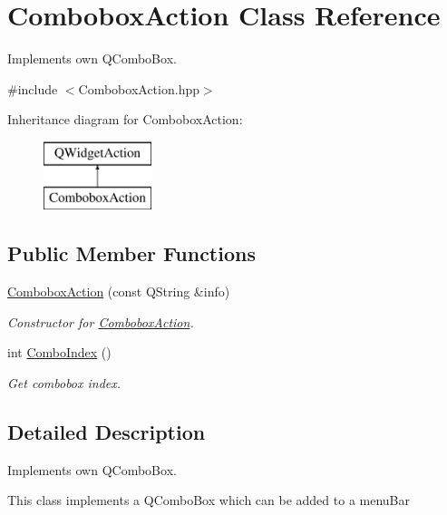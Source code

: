 \hypertarget{classComboboxAction}{}\section{Combobox\+Action Class Reference}
\label{classComboboxAction}


Implements own Q\+Combo\+Box.  




{\ttfamily \#include $<$Combobox\+Action.\+hpp$>$}

Inheritance diagram for Combobox\+Action\+:\begin{figure}[H]
\begin{center}
\leavevmode
\includegraphics[height=2.000000cm]{classComboboxAction}
\end{center}
\end{figure}
\subsection*{Public Member Functions}
\begin{DoxyCompactItemize}
\item 
\mbox{\hyperlink{classComboboxAction_afa2a6bfade094a82beef7d478c5a4cf8}{Combobox\+Action}} (const Q\+String \&info)
\begin{DoxyCompactList}\small\item\em Constructor for \mbox{\hyperlink{classComboboxAction}{Combobox\+Action}}. \end{DoxyCompactList}\item 
int \mbox{\hyperlink{classComboboxAction_adfe475154e5b88eddbc9a51759bdf312}{Combo\+Index}} ()
\begin{DoxyCompactList}\small\item\em Get combobox index. \end{DoxyCompactList}\end{DoxyCompactItemize}


\subsection{Detailed Description}
Implements own Q\+Combo\+Box. 

This class implements a Q\+Combo\+Box which can be added to a menu\+Bar 

